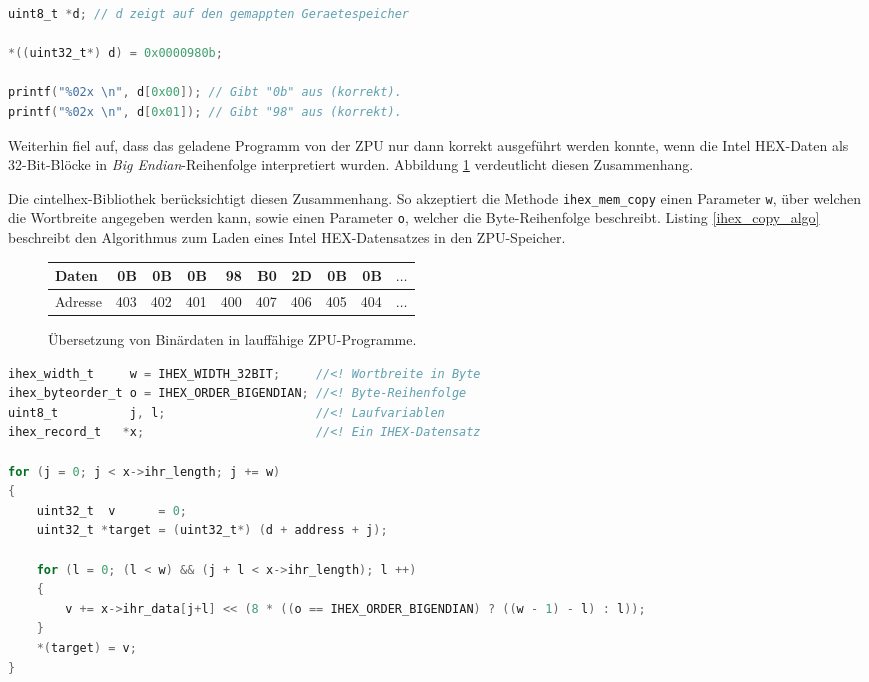 \documentclass[11pt]{scrartcl}
\begin{document}
\begin{lstlisting}[float=p,language=C,caption=Korrektes Verhalten des ZPU-Speichers bei 32-Bit-Zugriff,morekeywords={uint8_t,uint32_t},label=zpu_mem_32bit]
uint8_t *d; // d zeigt auf den gemappten Geraetespeicher

*((uint32_t*) d) = 0x0000980b;

printf("%02x \n", d[0x00]); // Gibt "0b" aus (korrekt).
printf("%02x \n", d[0x01]); // Gibt "98" aus (korrekt).
\end{lstlisting}

Weiterhin fiel auf, dass das geladene Programm von der ZPU nur dann korrekt ausgeführt werden konnte, wenn die Intel HEX-Daten als 32-Bit-Blöcke in \emph{Big Endian}-Reihenfolge interpretiert wurden. Abbildung  \ref{zpu_addresses} verdeutlicht diesen Zusammenhang.

Die cintelhex-Bibliothek berücksichtigt diesen Zusammenhang. So akzeptiert die Methode \texttt{ihex\_mem\_copy} einen Parameter \texttt{w}, über welchen die Wortbreite angegeben werden kann, sowie einen Parameter \texttt{o}, welcher die Byte-Reihenfolge beschreibt. Listing \ref{ihex_copy_algo} beschreibt den Algorithmus zum Laden eines Intel HEX-Datensatzes in den ZPU-Speicher.

\begin{figure}
\begin{center}
\begin{tabular}{lrrrrrrrrc}
	\toprule
	Daten   &  0B &  0B &  0B &  98 &  B0 &  2D &  0B &  0B & $\ldots$ \\ \midrule
	Adresse & 403 & 402 & 401 & 400 & 407 & 406 & 405 & 404 & $\ldots$ \\ \bottomrule
\end{tabular}
\end{center}
\caption{Übersetzung von Binärdaten in lauffähige ZPU-Programme.}
\label{zpu_addresses}
\end{figure}

\begin{lstlisting}[float=p,language=C,caption=Algorithmus zum Laden eines Intel HEX-Datensatzes in den ZPU-Speicher,morekeywords={uint8_t, uint32_t, ihex_width_t, ihex_record_t, ihex_byteorder_t},label=ihex_copy_algo]
ihex_width_t     w = IHEX_WIDTH_32BIT;     //<! Wortbreite in Byte
ihex_byteorder_t o = IHEX_ORDER_BIGENDIAN; //<! Byte-Reihenfolge
uint8_t          j, l;                     //<! Laufvariablen
ihex_record_t   *x;                        //<! Ein IHEX-Datensatz

for (j = 0; j < x->ihr_length; j += w)
{
	uint32_t  v      = 0;
	uint32_t *target = (uint32_t*) (d + address + j);
					
	for (l = 0; (l < w) && (j + l < x->ihr_length); l ++)
	{
		v += x->ihr_data[j+l] << (8 * ((o == IHEX_ORDER_BIGENDIAN) ? ((w - 1) - l) : l));
	}
	*(target) = v;
}
\end{lstlisting}
\end{document}
